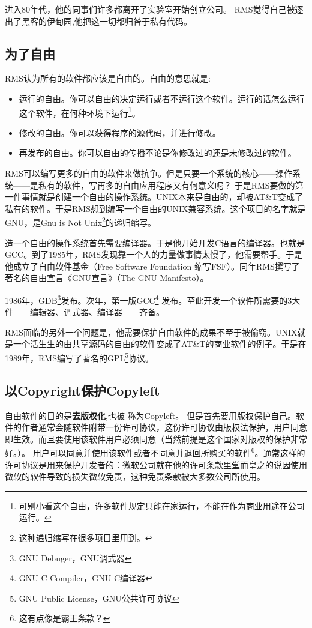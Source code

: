 \documentclass[amstex]{ctexbook}
\begin{document}
进入80年代，他的同事们许多都离开了实验室开始创立公司。
RMS觉得自己被逐出了黑客的伊甸园,他把这一切都归咎于私有代码。

\subsection{为了自由}

RMS认为所有的软件都应该是自由的。自由的意思就是:
\begin{itemize}
\item 运行的自由。你可以自由的决定运行或者不运行这个软件。运行的话怎么运行这个软件，在何种环境下运行\footnote{可别小看这个自由，许多软件规定只能在家运行，不能在作为商业用途在公司运行。}。
\item 修改的自由。你可以获得程序的源代码，并进行修改。
\item 再发布的自由。你可以自由的传播不论是你修改过的还是未修改过的软件。
\end{itemize}

RMS可以编写更多的自由的软件来做抗争。但是只要一个系统的核心------操作系统------是私有的软件，写再多的自由应用程序又有何意义呢？
于是RMS要做的第一件事情就是创建一个自由的操作系统。UNIX本来是自由的，却被AT\&T变成了私有的软件。于是RMS想到编写一个自由的UNIX兼容系统。这个项目的名字就是GNU，是Gnu is Not Unix\footnote{这种递归缩写在很多项目里用到。}的递归缩写。

造一个自由的操作系统首先需要编译器。于是他开始开发C语言的编译器。也就是GCC。到了1985年，RMS发现靠一个人的力量做事情太慢了，他需要帮手。于是他成立了自由软件基金（Free Software Foundation 缩写FSF）。同年RMS撰写了著名的自由宣言《GNU宣言》（The GNU Manifesto）。

1986年，GDB\footnote{GNU Debuger，GNU调式器}发布。次年，第一版GCC\footnote{GNU C Compiler，GNU C编译器} 发布。至此开发一个软件所需要的3大件------编辑器、调式器、编译器------齐备。

RMS面临的另外一个问题是，他需要保护自由软件的成果不至于被偷窃。UNIX就是一个活生生的由共享源码的自由的软件变成了AT\&T的商业软件的例子。于是在1989年，RMS编写了著名的GPL\footnote{GNU Public License，GNU公共许可协议}协议。

\subsection{以Copyright保护Copyleft}

自由软件的目的是\textbf{去版权化},也被 称为Copyleft。
但是首先要用版权保护自己。软件的作者通常会随软件附带一份许可协议，这份许可协议由版权法保护，用户同意即生效。而且要使用该软件用户必须同意（当然前提是这个国家对版权的保护非常好。）。
用户可以同意并使用该软件或者不同意并退回所购买的软件\footnote{这有点像是霸王条款？}。通常这样的许可协议是用来保护开发者的：微软公司就在他的许可条款里堂而皇之的说因使用微软的软件导致的损失微软免责，这种免责条款被大多数公司所使用。
\end{document}
